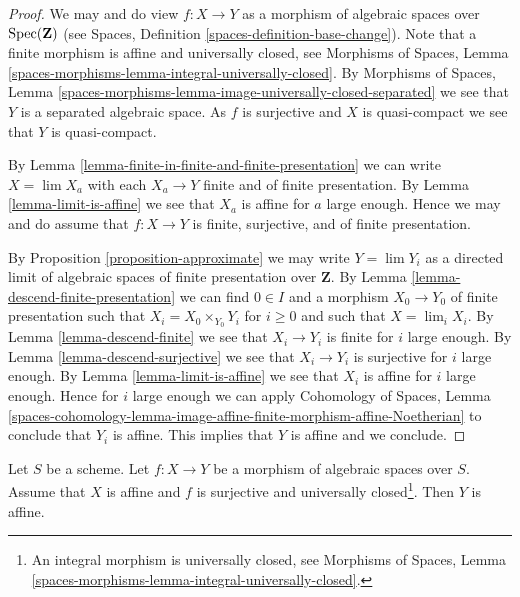 \begin{proof}
We may and do view $f : X \to Y$ as a morphism of algebraic spaces over
$\mathop{\mathrm{Spec}}(\mathbf{Z})$ (see
Spaces, Definition \ref{spaces-definition-base-change}).
Note that a finite morphism is affine and universally closed, see
Morphisms of Spaces, Lemma
\ref{spaces-morphisms-lemma-integral-universally-closed}.
By Morphisms of Spaces, Lemma
\ref{spaces-morphisms-lemma-image-universally-closed-separated}
we see that $Y$ is a separated algebraic space.
As $f$ is surjective and $X$ is quasi-compact we see that $Y$ is
quasi-compact.

\medskip\noindent
By Lemma \ref{lemma-finite-in-finite-and-finite-presentation}
we can write $X = \lim X_a$ with each $X_a \to Y$ finite and of
finite presentation. By
Lemma \ref{lemma-limit-is-affine}
we see that $X_a$ is affine for $a$ large enough.
Hence we may and do assume that $f : X \to Y$ is finite, surjective, and
of finite presentation.

\medskip\noindent
By Proposition \ref{proposition-approximate} we may write
$Y = \lim Y_i$ as a directed limit of algebraic
spaces of finite presentation over $\mathbf{Z}$.
By Lemma \ref{lemma-descend-finite-presentation} we can
find $0 \in I$ and a morphism $X_0 \to Y_0$ of finite presentation
such that $X_i = X_0 \times_{Y_0} Y_i$ for $i \geq 0$
and such that $X = \lim_i X_i$. By
Lemma \ref{lemma-descend-finite}
we see that $X_i \to Y_i$ is finite for $i$ large enough.
By Lemma \ref{lemma-descend-surjective}
we see that $X_i \to Y_i$ is surjective for $i$ large enough.
By Lemma \ref{lemma-limit-is-affine} we see that $X_i$ is
affine for $i$ large enough. Hence for $i$ large enough we can apply
Cohomology of Spaces, Lemma
\ref{spaces-cohomology-lemma-image-affine-finite-morphism-affine-Noetherian}
to conclude that $Y_i$ is affine. This implies that $Y$ is affine and
we conclude.
\end{proof}

\begin{proposition}
\label{proposition-affine}
Let $S$ be a scheme. Let $f : X \to Y$ be a morphism of algebraic spaces
over $S$. Assume that $X$ is affine and $f$ is surjective and universally
closed\footnote{An integral morphism is universally closed, see
Morphisms of Spaces, Lemma
\ref{spaces-morphisms-lemma-integral-universally-closed}.}. Then $Y$ is affine.
\end{proposition}

